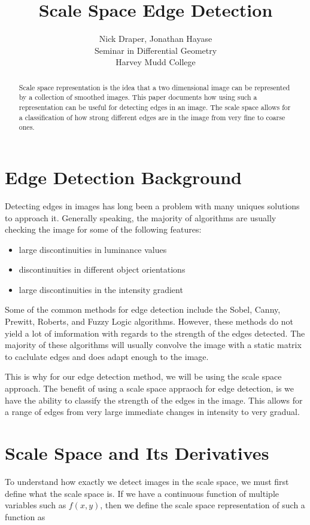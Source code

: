 \documentclass{article}
\title{Scale Space Edge Detection}
\author{
  Nick Draper, Jonathan Hayase\\
  Seminar in Differential Geometry\\
  Harvey Mudd College
}
\begin{document}
\maketitle

\begin{abstract}
  Scale space representation is the idea that a two dimensional image can be represented by a collection of smoothed images.
  This paper documents how using such a representation can be useful for detecting edges in an image.
  The scale space allows for a classification of how strong different edges are in the image from very fine to coarse ones. 
\end{abstract}

\section{Edge Detection Background}
Detecting edges in images has long been a problem with many uniques solutions to approach it.
Generally speaking, the majority of algorithms are usually checking the image for some of the following features:

\begin{itemize}
\item large discontinuities in luminance values
\item discontinuities in different object orientations
\item large discontinuities in the intensity gradient
\end{itemize}

\indent Some of the common methods for edge detection include the Sobel, Canny, Prewitt, Roberts, and Fuzzy Logic algorithms.
However, these methods do not yield a lot of imformation with regards to the strength of the edges detected.
The majority of these algorithms will usually convolve the image with a static matrix to caclulate edges and does adapt enough to the image. 

This is why for our edge detection method, we will be using the scale space approach.
The benefit of using a scale space appraoch for edge detection, is we have the ability to classify the strength of the edges in the image.
This allows for a range of edges from very large immediate changes in intensity to very gradual.

\section{Scale Space and Its Derivatives}
To understand how exactly we detect images in the scale space, we must first define what the scale space is.
If we have a continuous function of multiple variables such as $f(x,y)$, then we define the scale space representation of such a function as 
\end{document}
